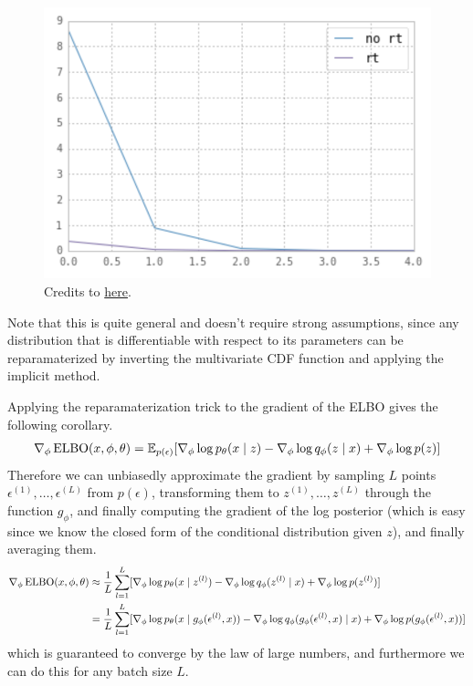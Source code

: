 \begin{example}[Gradient of Expection of $f(x) = x^2$ w.r.t. Gaussian]
    \begin{figure}[H]
      \centering 
      \includegraphics[scale=0.6]{img/reparam.png}
      \caption{Credits to \href{https://stats.stackexchange.com/questions/199605/how-does-the-reparameterization-trick-for-vaes-work-and-why-is-it-important}{here}.} 
      \label{fig:reparam}
    \end{figure}
  \end{example}

  Note that this is quite general and doesn't require strong assumptions, since any distribution that is differentiable with respect to its parameters can be reparamaterized by inverting the multivariate CDF function and applying the implicit method. 

  \begin{corollary}
    Applying the reparamaterization trick to the gradient of the ELBO gives the following corollary. 
    \begin{equation}
      \nabla_\phi \elbo(x, \phi, \theta) = \mathbb{E}_{p(\epsilon)}[\nabla_\phi \log p_\theta (x \mid z) - \nabla_\phi \log q_\phi (z \mid x) + \nabla_\phi \log p(z)]
    \end{equation}
    Therefore we can unbiasedly approximate the gradient by sampling $L$ points $\epsilon^{(1)}, \ldots, \epsilon^{(L)}$ from $p(\epsilon)$, transforming them to $z^{(1)}, \ldots, z^{(L)}$ through the function $g_\phi$, and finally computing the gradient of the log posterior (which is easy since we know the closed form of the conditional distribution given $z$), and finally averaging them. 
    \begin{align*}
      \nabla_\phi \elbo(x, \phi, \theta) & \approx \frac{1}{L} \sum_{l=1}^L [\nabla_\phi \log p_\theta (x \mid z^{(l)}) - \nabla_\phi \log q_\phi (z^{(l)} \mid x) + \nabla_\phi \log p(z^{(l)})] \\
                                         & = \frac{1}{L} \sum_{l=1}^L [\nabla_\phi \log p_\theta (x \mid g_\phi (\epsilon^{(l)}, x)) - \nabla_\phi \log q_\phi (g_\phi (\epsilon^{(l)}, x) \mid x) + \nabla_\phi \log p(g_\phi (\epsilon^{(l)}, x))]
    \end{align*}
    which is guaranteed to converge by the law of large numbers, and furthermore we can do this for any batch size $L$. 
  \end{corollary}


